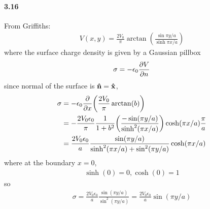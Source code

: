 \documentclass[../main.tex]{subfiles}
\begin{document}
\pagestyle{fancy}

\setcounter{section}{5}

\paragraph{3.16} 

From Griffiths:
\begin{align*}
    V(x,y) = \frac{2V_0}{\pi} \arctan(\frac{\sin\pi y/a}{\sinh\pi x/a})
\end{align*}
where the surface charge density is given by a Gaussian pillbox
\begin{align*}
    \sigma = -\epsilon_0 \pdv{V}{n}
\end{align*}
since normal of the surface is $\vu{n} = \vu{x}$,
\begin{align*}
    \sigma &= -\epsilon_0 \pdv{x} \qt(
        \frac{2V_0}{\pi} \arctan(b)
    ) \\
    &= -\frac{2V_0 \epsilon_0}{\pi} \frac{1}{1 + b^2} \qt(\frac{-\sin(\pi y/a)}{\sinh^2(\pi x/a)}) \cosh(\pi x/a) \frac{\pi}{a} \\
    &= \frac{2V_0 \epsilon_0}{a} \frac{\sin(\pi y/a)}{\sinh^2(\pi x/a) + \sin^2(\pi y/a)} \cosh(\pi x/a)
\end{align*}
where at the boundary $x = 0$,
\begin{align*}
    \sinh(0) = 0, \cosh(0) = 1
\end{align*}
so 
\begin{align*}
    \sigma = \frac{2V_0 \epsilon_0}{a} \frac{\sin(\pi y/a)}{\sin^2(\pi y/a)} = \boxed{\frac{2V_0 \epsilon_0}{a} \sin(\pi y/a)}
\end{align*}

\newpage
\end{document}
